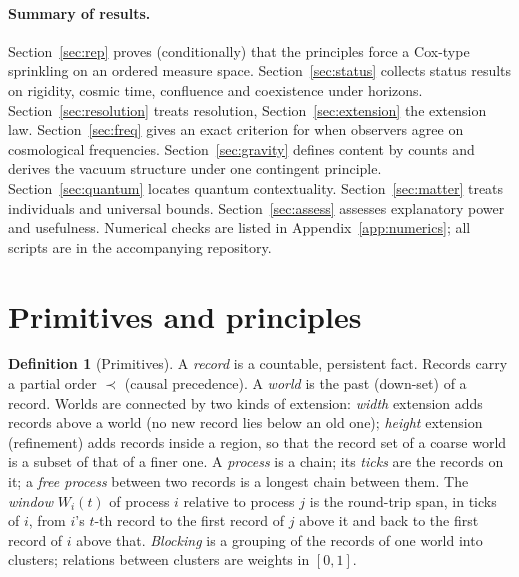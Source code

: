 \documentclass[11pt]{article}
\theoremstyle{definition}
\newtheorem{definition}[theorem]{Definition}
\theoremstyle{remark}
\begin{document}
\paragraph{Summary of results.} Section~\ref{sec:rep} proves (conditionally) that the principles force a Cox-type sprinkling on an ordered measure space. Section~\ref{sec:status} collects status results on rigidity, cosmic time, confluence and coexistence under horizons. Section~\ref{sec:resolution} treats resolution, Section~\ref{sec:extension} the extension law. Section~\ref{sec:freq} gives an exact criterion for when observers agree on cosmological frequencies. Section~\ref{sec:gravity} defines content by counts and derives the vacuum structure under one contingent principle. Section~\ref{sec:quantum} locates quantum contextuality. Section~\ref{sec:matter} treats individuals and universal bounds. Section~\ref{sec:assess} assesses explanatory power and usefulness. Numerical checks are listed in Appendix~\ref{app:numerics}; all scripts are in the accompanying repository.

\section{Primitives and principles}\label{sec:prim}

\begin{definition}[Primitives]
A \emph{record} is a countable, persistent fact. Records carry a partial order $\prec$ (causal precedence). A \emph{world} is the past (down-set) of a record. Worlds are connected by two kinds of extension: \emph{width} extension adds records above a world (no new record lies below an old one); \emph{height} extension (refinement) adds records inside a region, so that the record set of a coarse world is a subset of that of a finer one. A \emph{process} is a chain; its \emph{ticks} are the records on it; a \emph{free process} between two records is a longest chain between them. The \emph{window} $W_i(t)$ of process $i$ relative to process $j$ is the round-trip span, in ticks of $i$, from $i$'s $t$-th record to the first record of $j$ above it and back to the first record of $i$ above that. \emph{Blocking} is a grouping of the records of one world into clusters; relations between clusters are weights in $[0,1]$.
\end{definition}
\end{document}
